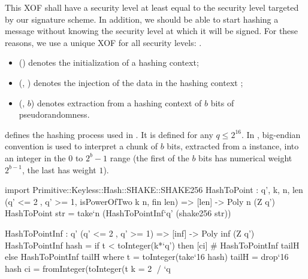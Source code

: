 This XOF shall have a security level at least equal to the security level targeted by our signature scheme. In addition, we should be able to start hashing a message without knowing the security level at which it will be signed. For these reasons, we use a unique XOF for all security levels: \shake.
\begin{itemize}
 \item \shakeinit() denotes the initialization of a \shake hashing context;
 \item \shakeinject(\shakectx, \str) denotes the injection of the data \str in the hashing context \shakectx;
 \item \shakeextract(\shakectx, $b$) denotes extraction from a hashing context \shakectx of $b$ bits of pseudorandomness.
\end{itemize}
 
\longhashtopoint defines the hashing process used in \falcon. It is defined for any $q \leq 2^{16}$. In \falcon, big-endian convention is used to interpret a chunk of $b$
bits, extracted from a \shake instance, into an integer in the $0$ to
$2^b-1$ range (the first of the $b$ bits has numerical weight $2^{b-1}$,
the last has weight $1$).

\begin{algorithm}[htb]
\caption{$\hashtopoint(\str, q, n)$}\label{alg:hashtopoint}
\begin{algorithmic}[1]
\State{$\shakectx \gets \shakeinit()$}
\State{$\shakeinject(\shakectx, \str)$}
\label{step:extract}
 \label{alg:hashtopoint:cmp}\label{step:check}
 \label{alg:hashtopoint:mod}
\EndIf
\EndWhile
{}
\end{algorithmic}
\end{algorithm}

\begin{code}
  import Primitive::Keyless::Hash::SHAKE::SHAKE256
  HashToPoint : {q', k, n, len}
    (q' <= 2^^16, q' >= 1, isPowerOfTwo k n, fin len) =>
    [len] -> Poly n (Z q')
  HashToPoint str = take`{n} (HashToPointInf`{q'} (shake256 str))

  HashToPointInf : {q'} (q' <= 2^^16, q' >= 1) =>
    [inf] -> Poly inf (Z q')
  HashToPointInf hash =
    if t < toInteger(k*`q') then 
      [ci] # HashToPointInf tailH
    else 
      HashToPointInf tailH
    where
      t = toInteger(take`{16} hash)
      tailH = drop`{16} hash
      ci = fromInteger(toInteger(t%
      k = 2^^16 / `q
\end{code}

